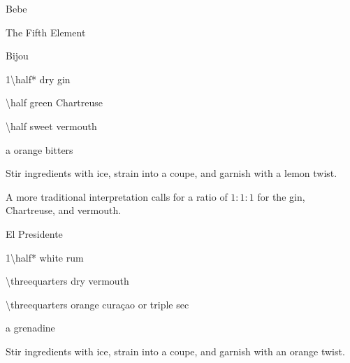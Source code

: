 \begin{Cocktail*}{Bebe}
	\begin{Ingredients}
	\item
	\end{Ingredients}
	
	\begin{Instructions}
	
	\end{Instructions}
\end{Cocktail*}

\begin{Cocktail*}{The Fifth Element}
	\begin{Ingredients}
	\item
	\end{Ingredients}
	
	\begin{Instructions}
	
	\end{Instructions}
\end{Cocktail*}

\begin{Cocktail}{Bijou}
	\begin{Ingredients}
	\item \SI{1\half*}{\oz} dry gin
	\item \SI{\half}{\oz} green Chartreuse
	\item \SI{\half}{\oz} sweet vermouth
	\item a \si{\dash} orange bitters
	\end{Ingredients}
	
	\begin{Instructions}
	Stir ingredients with ice, strain into a coupe, and garnish with a lemon twist.
	
	A more traditional interpretation calls for a ratio of $1:1:1$ for the gin, Chartreuse, and vermouth. 
	\end{Instructions}
\end{Cocktail}

\begin{Cocktail}{El Presidente}
	\begin{Ingredients}
	\item \SI{1\half*}{\oz} white rum
	\item \SI{\threequarters}{\oz} dry vermouth
	\item \SI{\threequarters}{\oz} orange cura\c{c}ao or triple sec
	\item a \si{\dash} grenadine
	\end{Ingredients}
	
	\begin{Instructions}
	Stir ingredients with ice, strain into a coupe, and garnish with an orange twist.
	\end{Instructions}
\end{Cocktail}

